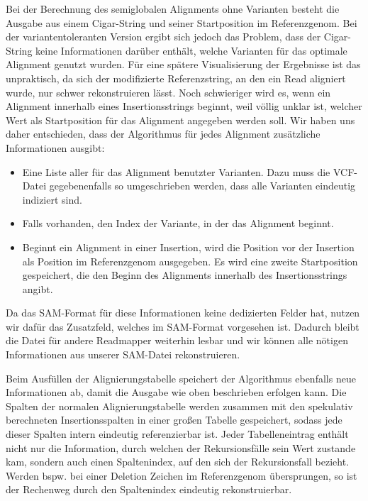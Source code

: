 Bei der Berechnung des semiglobalen Alignments ohne Varianten besteht die Ausgabe aus einem Cigar-String und seiner Startposition im Referenzgenom. Bei der variantentoleranten Version ergibt sich jedoch das Problem, dass der Cigar-String keine Informationen darüber enthält, welche Varianten für das optimale Alignment genutzt wurden. Für eine spätere Visualisierung der Ergebnisse ist das unpraktisch, da sich der modifizierte Referenzstring, an den ein Read aligniert wurde, nur schwer rekonstruieren lässt. Noch schwieriger wird es, wenn ein Alignment innerhalb eines Insertionsstrings beginnt, weil völlig unklar ist, welcher Wert als Startposition für das Alignment angegeben werden soll. Wir haben uns daher entschieden, dass der Algorithmus für jedes Alignment zusätzliche Informationen ausgibt:

\begin{itemize}
\item Eine Liste aller für das Alignment benutzter Varianten. Dazu muss die VCF-Datei gegebenenfalls so umgeschrieben werden, dass alle Varianten eindeutig indiziert sind.
\item Falls vorhanden, den Index der Variante, in der das Alignment beginnt.
\item Beginnt ein Alignment in einer Insertion, wird die Position vor der Insertion als Position im Referenzgenom ausgegeben. Es wird eine zweite Startposition gespeichert, die den Beginn des Alignments innerhalb des Insertionsstrings angibt.
\end{itemize}

Da das SAM-Format für diese Informationen keine dedizierten Felder hat, nutzen wir dafür das Zusatzfeld, welches im SAM-Format vorgesehen ist. Dadurch bleibt die Datei für andere Readmapper weiterhin lesbar und wir können alle nötigen Informationen aus unserer SAM-Datei rekonstruieren.

Beim Ausfüllen der Alignierungstabelle speichert der Algorithmus ebenfalls neue Informationen ab, damit die Ausgabe wie oben beschrieben erfolgen kann. Die Spalten der normalen Alignierungstabelle werden zusammen mit den spekulativ berechneten Insertionsspalten in einer großen Tabelle gespeichert, sodass jede dieser Spalten intern eindeutig referenzierbar ist. Jeder Tabelleneintrag enthält nicht nur die Information, durch welchen der Rekursionsfälle sein Wert zustande kam, sondern auch einen Spaltenindex, auf den sich der Rekursionsfall bezieht. Werden bspw. bei einer Deletion Zeichen im Referenzgenom übersprungen, so ist der Rechenweg durch den Spaltenindex eindeutig rekonstruierbar.

